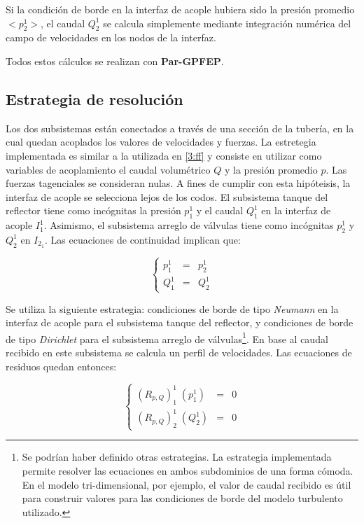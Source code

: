 Si la condición de borde en la interfaz de acople hubiera sido la presión promedio $<p_2^1>$,
el caudal $Q_2^1$ se calcula simplemente mediante integración numérica del campo de velocidades en los nodos de la interfaz.

Todos estos cálculos se realizan con \textbf{Par-GPFEP}.

\subsection{Estrategia de resolución}

Los dos subsistemas están conectados a través de una sección de la tubería,
en la cual quedan acoplados los valores de velocidades y fuerzas.
La estretegia implementada es similar a la utilizada en \ref{3:ff} y consiste en utilizar como variables de acoplamiento el caudal volumétrico $Q$ y la presión promedio $p$.
Las fuerzas tagenciales se consideran nulas.
A fines de cumplir con esta hipóteisis, la interfaz de acople se selecciona lejos de los codos.
El subsistema tanque del reflector tiene como incógnitas la presión $p_1^1$ y el caudal $Q_1^1$ en la interfaz de acople $I_1^1$.
Asimismo, el subsistema arreglo de válvulas tiene como incógnitas $p_2^1$ y $Q_2^1$ en $I_{2_1}$.
Las ecuaciones de continuidad implican que:

\begin{equation}
\left\{ \begin{array}{rcl}
p_1^1 &=& p_2^1 \\
Q_1^1 &=& Q_2^1
\end{array}
\right.
\end{equation}

Se utiliza la siguiente estrategia:
condiciones de borde de tipo \textit{Neumann} en la interfaz de acople para el subsistema tanque del reflector,
y condiciones de borde de tipo \textit{Dirichlet} para el subsistema arreglo de válvulas\footnote{
Se podrían haber definido otras estrategias.
La estrategia implementada permite resolver las ecuaciones en ambos subdominios de una forma cómoda.
En el modelo tri-dimensional, por ejemplo, el valor de caudal recibido es útil para construir valores para las condiciones de borde del modelo turbulento utilizado.
}.
En base al caudal recibido en este subsistema se calcula un perfil de velocidades.
Las ecuaciones de residuos quedan entonces:

\begin{equation}
\left\{ \begin{array}{rcl}
(R_{p,Q})_{1}^{1}  \;(p_1^1) &=& 0 \\
(R_{p,Q})_{2}^{1}  \;(Q_2^1) &=& 0
\end{array}
\right.
\end{equation}

